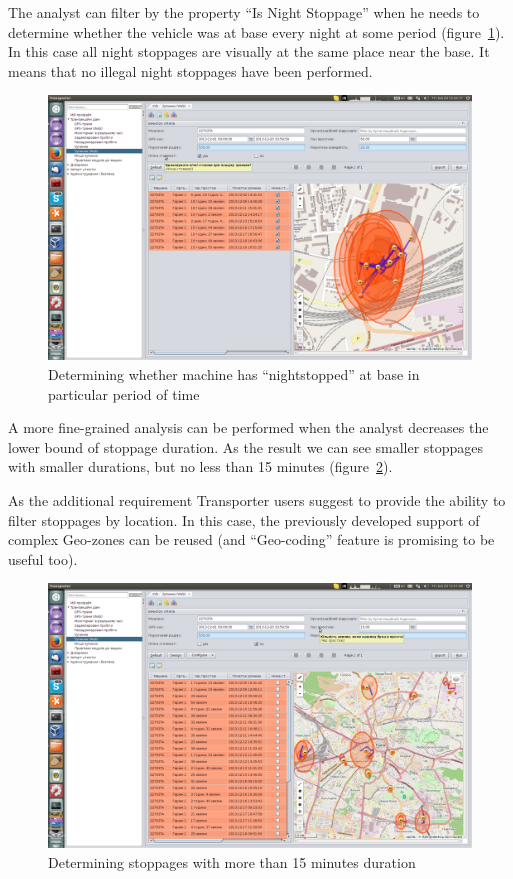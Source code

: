 \newpage
The analyst can filter by the property ``Is Night Stoppage'' when he needs to determine whether the vehicle was at base every night at some period (figure~\ref{fig:26}). In this case all night stoppages are visually at the same place near the base. It means that no illegal night stoppages have been performed.

\begin{figure}[H]
\centering
\includegraphics[width=\linewidth]{chapters/03-stoppages/images/26-determining-whether-machine-has-nightstopped-at-base-in-particular-period-of-time.png}
\caption{Determining whether machine has ``nightstopped'' at base in particular period of time}\label{fig:26}
\end{figure}

\newpage
A more fine-grained analysis can be performed when the analyst decreases the lower bound of stoppage duration. As the result we can see smaller stoppages with smaller durations, but no less than 15 minutes (figure~\ref{fig:27}).

As the additional requirement Transporter users suggest to provide the ability to filter stoppages by location. In this case, the previously developed support of complex Geo-zones can be reused (and ``Geo-coding'' feature is promising to be useful too).

\begin{figure}[H]
\centering
\includegraphics[width=\linewidth]{chapters/03-stoppages/images/27-determining-stoppages-with-more-than-15-minutes-duration.png}
\caption{Determining stoppages with more than 15 minutes duration}\label{fig:27}
\end{figure}